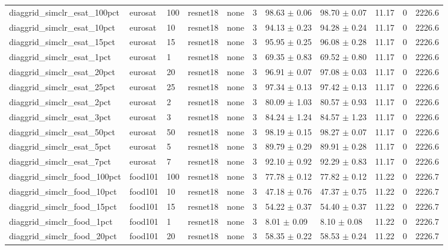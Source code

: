 \begin{tabular}{lllllllllll}
diaggrid_simclr_esat_100pct & eurosat & 100 & resnet18 & none & 3 & 98.63 $\pm$ 0.06 & 98.70 $\pm$ 0.07 & 11.17 & 0 & 2226.6 \\
diaggrid_simclr_esat_10pct & eurosat & 10 & resnet18 & none & 3 & 94.13 $\pm$ 0.23 & 94.28 $\pm$ 0.24 & 11.17 & 0 & 2226.6 \\
diaggrid_simclr_esat_15pct & eurosat & 15 & resnet18 & none & 3 & 95.95 $\pm$ 0.25 & 96.08 $\pm$ 0.28 & 11.17 & 0 & 2226.6 \\
diaggrid_simclr_esat_1pct & eurosat & 1 & resnet18 & none & 3 & 69.35 $\pm$ 0.83 & 69.52 $\pm$ 0.80 & 11.17 & 0 & 2226.6 \\
diaggrid_simclr_esat_20pct & eurosat & 20 & resnet18 & none & 3 & 96.91 $\pm$ 0.07 & 97.08 $\pm$ 0.03 & 11.17 & 0 & 2226.6 \\
diaggrid_simclr_esat_25pct & eurosat & 25 & resnet18 & none & 3 & 97.34 $\pm$ 0.13 & 97.42 $\pm$ 0.13 & 11.17 & 0 & 2226.6 \\
diaggrid_simclr_esat_2pct & eurosat & 2 & resnet18 & none & 3 & 80.09 $\pm$ 1.03 & 80.57 $\pm$ 0.93 & 11.17 & 0 & 2226.6 \\
diaggrid_simclr_esat_3pct & eurosat & 3 & resnet18 & none & 3 & 84.24 $\pm$ 1.24 & 84.57 $\pm$ 1.23 & 11.17 & 0 & 2226.6 \\
diaggrid_simclr_esat_50pct & eurosat & 50 & resnet18 & none & 3 & 98.19 $\pm$ 0.15 & 98.27 $\pm$ 0.07 & 11.17 & 0 & 2226.6 \\
diaggrid_simclr_esat_5pct & eurosat & 5 & resnet18 & none & 3 & 89.79 $\pm$ 0.29 & 89.91 $\pm$ 0.28 & 11.17 & 0 & 2226.6 \\
diaggrid_simclr_esat_7pct & eurosat & 7 & resnet18 & none & 3 & 92.10 $\pm$ 0.92 & 92.29 $\pm$ 0.83 & 11.17 & 0 & 2226.6 \\
diaggrid_simclr_food_100pct & food101 & 100 & resnet18 & none & 3 & 77.78 $\pm$ 0.12 & 77.82 $\pm$ 0.12 & 11.22 & 0 & 2226.7 \\
diaggrid_simclr_food_10pct & food101 & 10 & resnet18 & none & 3 & 47.18 $\pm$ 0.76 & 47.37 $\pm$ 0.75 & 11.22 & 0 & 2226.7 \\
diaggrid_simclr_food_15pct & food101 & 15 & resnet18 & none & 3 & 54.22 $\pm$ 0.37 & 54.40 $\pm$ 0.37 & 11.22 & 0 & 2226.7 \\
diaggrid_simclr_food_1pct & food101 & 1 & resnet18 & none & 3 & 8.01 $\pm$ 0.09 & 8.10 $\pm$ 0.08 & 11.22 & 0 & 2226.7 \\
diaggrid_simclr_food_20pct & food101 & 20 & resnet18 & none & 3 & 58.35 $\pm$ 0.22 & 58.53 $\pm$ 0.24 & 11.22 & 0 & 2226.7 \\

\end{tabular}
